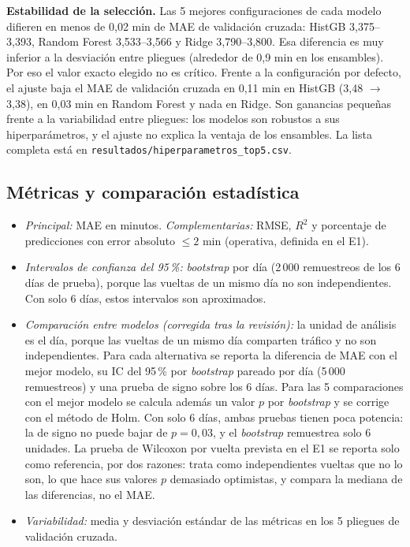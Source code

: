 \documentclass[conference,spanish]{IEEEtran}
\begin{document}
\textbf{Estabilidad de la selección.} Las 5 mejores configuraciones de cada modelo difieren en menos de 0,02 min de MAE de validación cruzada: HistGB 3,375--3,393, Random Forest 3,533--3,566 y Ridge 3,790--3,800. Esa diferencia es muy inferior a la desviación entre pliegues (alrededor de 0,9 min en los ensambles). Por eso el valor exacto elegido no es crítico. Frente a la configuración por defecto, el ajuste baja el MAE de validación cruzada en 0,11 min en HistGB (3,48 $\to$ 3,38), en 0,03 min en Random Forest y nada en Ridge. Son ganancias pequeñas frente a la variabilidad entre pliegues: los modelos son robustos a sus hiperparámetros, y el ajuste no explica la ventaja de los ensambles. La lista completa está en \texttt{resultados/hiperparametros\_top5.csv}.

\subsection{Métricas y comparación estadística}
\begin{itemize}
    \item \emph{Principal:} MAE en minutos. \emph{Complementarias:} RMSE, $R^2$ y porcentaje de predicciones con error absoluto $\le2$ min (operativa, definida en el E1).
    \item \emph{Intervalos de confianza del 95\,\%:} \textit{bootstrap} por día (2\,000 remuestreos de los 6 días de prueba), porque las vueltas de un mismo día no son independientes. Con solo 6 días, estos intervalos son aproximados.
    \item \emph{Comparación entre modelos (corregida tras la revisión):} la unidad de análisis es el día, porque las vueltas de un mismo día comparten tráfico y no son independientes. Para cada alternativa se reporta la diferencia de MAE con el mejor modelo, su IC del 95\,\% por \textit{bootstrap} pareado por día (5\,000 remuestreos) y una prueba de signo sobre los 6 días. Para las 5 comparaciones con el mejor modelo se calcula además un valor $p$ por \textit{bootstrap} y se corrige con el método de Holm. Con solo 6 días, ambas pruebas tienen poca potencia: la de signo no puede bajar de $p=0{,}03$, y el \textit{bootstrap} remuestrea solo 6 unidades. La prueba de Wilcoxon por vuelta prevista en el E1 se reporta solo como referencia, por dos razones: trata como independientes vueltas que no lo son, lo que hace sus valores $p$ demasiado optimistas, y compara la mediana de las diferencias, no el MAE.
    \item \emph{Variabilidad:} media y desviación estándar de las métricas en los 5 pliegues de validación cruzada.
\end{itemize}
\end{document}
